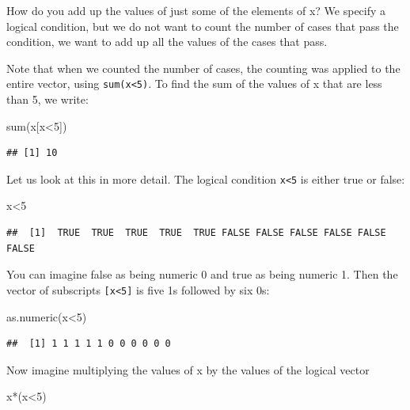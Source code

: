 \documentclass[
]{book}
\newenvironment{Shaded}{\begin{snugshade}}{\end{snugshade}}
\newcommand{\DecValTok}[1]{\textcolor[rgb]{0.00,0.00,0.81}{#1}}
\newcommand{\FunctionTok}[1]{\textcolor[rgb]{0.00,0.00,0.00}{#1}}
\newcommand{\NormalTok}[1]{#1}
\newcommand{\SpecialCharTok}[1]{\textcolor[rgb]{0.00,0.00,0.00}{#1}}
\theoremstyle{definition}
\theoremstyle{definition}
\theoremstyle{definition}
\theoremstyle{definition}
\theoremstyle{remark}
\begin{document}
How do you add up the values of just some of the elements of x? We specify a logical condition, but we do not want to count the number of cases that pass the condition, we want to add up all the values of the cases that pass.

Note that when we counted the number of cases, the counting was applied to the entire vector, using \texttt{sum(x\textless{}5)}. To find the sum of the values of x that are less than 5, we write:

\begin{Shaded}
\begin{Highlighting}[]
\FunctionTok{sum}\NormalTok{(x[x}\SpecialCharTok{\textless{}}\DecValTok{5}\NormalTok{])}
\end{Highlighting}
\end{Shaded}

\begin{verbatim}
## [1] 10
\end{verbatim}

Let us look at this in more detail. The logical condition \texttt{x\textless{}5} is either true or false:

\begin{Shaded}
\begin{Highlighting}[]
\NormalTok{x}\SpecialCharTok{\textless{}}\DecValTok{5}
\end{Highlighting}
\end{Shaded}

\begin{verbatim}
##  [1]  TRUE  TRUE  TRUE  TRUE  TRUE FALSE FALSE FALSE FALSE FALSE FALSE
\end{verbatim}

You can imagine false as being numeric 0 and true as being numeric 1. Then the vector of subscripts \texttt{{[}x\textless{}5{]}} is five 1s followed by six 0s:

\begin{Shaded}
\begin{Highlighting}[]
\FunctionTok{as.numeric}\NormalTok{(x}\SpecialCharTok{\textless{}}\DecValTok{5}\NormalTok{)}
\end{Highlighting}
\end{Shaded}

\begin{verbatim}
##  [1] 1 1 1 1 1 0 0 0 0 0 0
\end{verbatim}

Now imagine multiplying the values of x by the values of the logical vector

\begin{Shaded}
\begin{Highlighting}[]
\NormalTok{x}\SpecialCharTok{*}\NormalTok{(x}\SpecialCharTok{\textless{}}\DecValTok{5}\NormalTok{)}
\end{Highlighting}
\end{Shaded}
\end{document}
